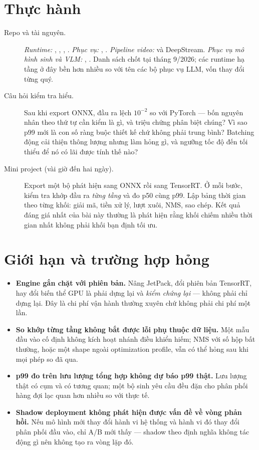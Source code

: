 \documentclass[../../deep_learning.tex]{subfiles}
\begin{document}
\section{Thực hành}
\begin{description}
\item[Repo và tài nguyên.] \emph{Runtime:} , , , . \emph{Phục vụ:} , . \emph{Pipeline video:}  và DeepStream. \emph{Phục vụ mô hình sinh và VLM:} , . Danh sách chốt tại tháng 9/2026; các runtime hạ tầng ở đây bền hơn nhiều so với tên các bộ phục vụ LLM, vốn thay đổi từng quý.

\item[Câu hỏi kiểm tra hiểu.] Sau khi export ONNX, đầu ra lệch $10^{-2}$ so với PyTorch --- bốn nguyên nhân theo thứ tự cần kiểm là gì, và triệu chứng phân biệt chúng? Vì sao p99 mới là con số ràng buộc thiết kế chứ không phải trung bình? Batching động cải thiện thông lượng nhưng làm hỏng gì, và ngưỡng tốc độ đến tối thiểu để nó có lãi được tính thế nào?

\item[Mini project (vài giờ đến hai ngày).] Export một bộ phát hiện sang ONNX rồi sang TensorRT. Ở mỗi bước, kiểm tra khớp đầu ra \emph{từng tầng} và đo p50 cùng p99. Lập bảng thời gian theo từng khối: giải mã, tiền xử lý, lượt xuôi, NMS, sao chép. Kết quả đáng giá nhất của bài này thường là phát hiện rằng khối chiếm nhiều thời gian nhất không phải khối bạn định tối ưu.

\end{description}

\section{Giới hạn và trường hợp hỏng}
\begin{itemize}
\item \textbf{Engine gắn chặt với phiên bản.} Nâng JetPack, đổi phiên bản TensorRT, hay đổi biến thể GPU là phải dựng lại và \emph{kiểm chứng lại} --- không phải chỉ dựng lại. Đây là chi phí vận hành thường xuyên chứ không phải chi phí một lần.
\item \textbf{So khớp từng tầng không bắt được lỗi phụ thuộc dữ liệu.} Một mẫu đầu vào cố định không kích hoạt nhánh điều khiển hiếm; NMS với số hộp bất thường, hoặc một shape ngoài optimization profile, vẫn có thể hỏng sau khi mọi phép so đã qua.
\item \textbf{p99 đo trên lưu lượng tổng hợp không dự báo p99 thật.} Lưu lượng thật có cụm và có tương quan; một bộ sinh yêu cầu đều đặn cho phân phối hàng đợi lạc quan hơn nhiều so với thực tế.
\item \textbf{Shadow deployment không phát hiện được vấn đề về vòng phản hồi.} Nếu mô hình mới thay đổi hành vi hệ thống và hành vi đó thay đổi phân phối đầu vào, chỉ A/B mới thấy --- shadow theo định nghĩa không tác động gì nên không tạo ra vòng lặp đó.
\end{itemize}
\end{document}
